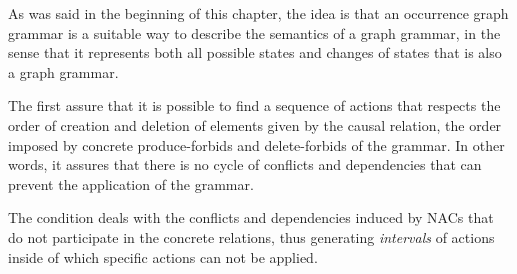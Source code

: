 As was said in the beginning of this chapter, the idea is that an occurrence graph grammar is a suitable way to describe the semantics of a graph grammar, in the sense that it represents both all possible states and changes of states that is also a graph grammar.

The first  assure that it is possible to find a sequence of actions that respects the order of creation and deletion of elements given by the causal relation,  the order imposed by concrete produce-forbids and delete-forbids of the grammar. In other words, it assures that there is no cycle of conflicts and dependencies that can prevent the application of the grammar.

The  condition deals with the conflicts and dependencies induced by NACs that do not participate in the concrete relations, thus generating \emph{intervals} of actions inside of which specific actions can not be applied. 
